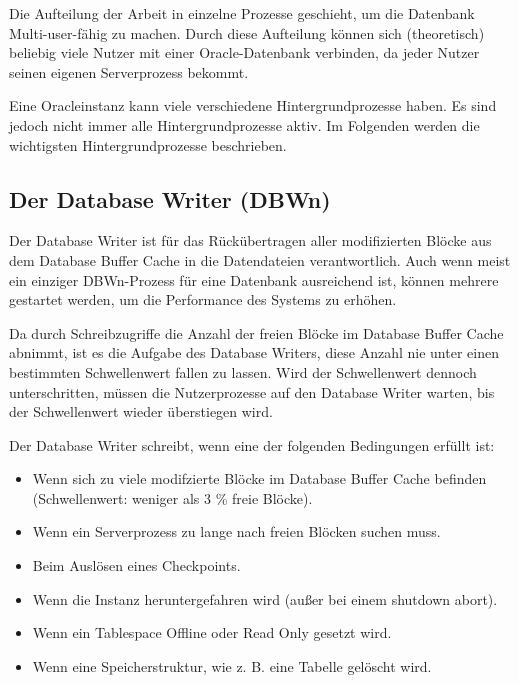         Die Aufteilung der Arbeit in einzelne Prozesse geschieht, um die Datenbank Multi-user-fähig zu machen. Durch diese Aufteilung können sich (theoretisch) beliebig viele Nutzer mit einer Oracle-Datenbank verbinden, da jeder Nutzer seinen eigenen Serverprozess bekommt.

        Eine Oracleinstanz kann viele verschiedene Hintergrundprozesse haben. Es sind jedoch nicht immer alle Hintergrundprozesse aktiv. Im Folgenden werden die wichtigsten Hintergrundprozesse beschrieben.
        \subsection{Der Database Writer (DBWn)}

          Der Database Writer ist für das Rückübertragen aller
          modifizierten Blöcke aus dem Database Buffer Cache in die
          Datendateien verantwortlich. Auch wenn meist ein einziger DBWn-Prozess
          für eine Datenbank ausreichend ist, können mehrere gestartet
          werden, um die Performance des Systems zu erhöhen.


          Da durch Schreibzugriffe die Anzahl der freien Blöcke im Database Buffer Cache abnimmt, ist es die Aufgabe des Database Writers, diese Anzahl nie unter einen bestimmten Schwellenwert fallen zu lassen. Wird der Schwellenwert dennoch unterschritten, müssen die Nutzerprozesse auf den Database Writer warten, bis der Schwellenwert wieder überstiegen wird.

          \begin{merke}
            Der Database Writer schreibt, wenn eine der folgenden Bedingungen erfüllt ist:
            \begin{itemize}
              \item Wenn sich zu viele modifzierte Blöcke im Database Buffer Cache befinden (Schwellenwert: weniger als 3 \% freie Blöcke).
              \item Wenn ein Serverprozess zu lange nach freien Blöcken suchen muss.
              \item Beim Auslösen eines Checkpoints.
              \item Wenn die Instanz heruntergefahren wird (außer bei einem shutdown abort).
              \item Wenn ein Tablespace Offline oder Read Only gesetzt wird.
              \item Wenn eine Speicherstruktur, wie z. B. eine Tabelle gelöscht wird.
            \end{itemize}
          \end{merke}
